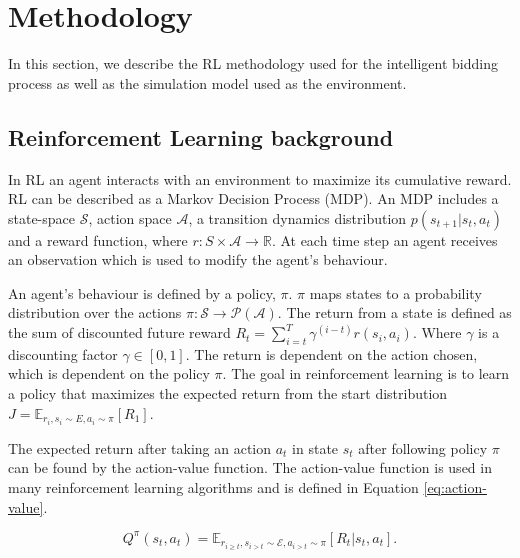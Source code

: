 \documentclass[conference]{IEEEtran}
\begin{document}
\section{Methodology}
\label{sec:material}

In this section, we describe the RL methodology used for the intelligent bidding process as well as the simulation model used as the environment.

\subsection{Reinforcement Learning background}


In RL an agent interacts with an environment to maximize its cumulative reward. RL can be described as a Markov Decision Process (MDP). An MDP includes a state-space $\mathcal{S}$, action space $\mathcal{A}$, a transition dynamics distribution $p(s_{t+1}|s_t,a_t)$ and a reward function, where $r:S\times \mathcal{A} \rightarrow \mathbb{R}$. At each time step an agent receives an observation which is used to modify the agent's behaviour.

An agent's behaviour is defined by a policy, $\pi$. $\pi$ maps states to a probability distribution over the actions $\pi:\mathcal{S}\rightarrow \mathcal{P}(\mathcal{A})$. The return from a state is defined as the sum of discounted future reward $R_t=\sum_{i=t}^T\gamma^{(i-t)}r(s_i,a_i)$. Where $\gamma$ is a discounting factor $\gamma \in [0,1]$. The return is dependent on the action chosen, which is dependent on the policy $\pi$. The goal in reinforcement learning is to learn a policy that maximizes the expected return from the start distribution $J=\mathbb{E}_{r_i,s_i \sim E,a_i \sim \pi}[R_1]$. 

The expected return after taking an action $a_t$ in state $s_t$ after following policy $\pi$ can be found by the action-value function. The action-value function is used in many reinforcement learning algorithms and is defined in Equation \ref{eq:action-value}.

\begin{equation}
	\label{eq:action-value}
	Q^{\pi}(s_t,a_t)=\mathbb{E}_{r_{i\geq t},s_{i>t}\sim \mathcal{E},a_{i>t}\sim\pi}[R_t|s_t,a_t].
\end{equation}
\end{document}
